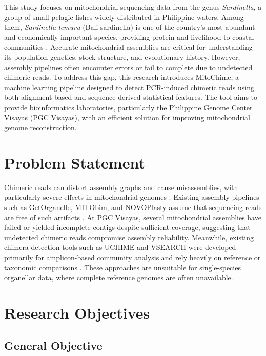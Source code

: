 This study focuses on mitochondrial sequencing data from the genus \textit{Sardinella}, a group of small pelagic fishes widely distributed in Philippine waters. Among them, \textit{Sardinella lemuru} (Bali sardinella) is one of the country’s most abundant and economically important species, providing protein and livelihood to coastal communities \citep{Willette2011,Labrador2021}. Accurate mitochondrial assemblies are critical for understanding its population genetics, stock structure, and evolutionary history. However, assembly pipelines often encounter errors or fail to complete due to undetected chimeric reads. To address this gap, this research introduces MitoChime, a machine learning pipeline designed to detect PCR-induced chimeric reads using both alignment-based and sequence-derived statistical features. The tool aims to provide bioinformatics laboratories, particularly the Philippine Genome Center Visayas (PGC Visayas), with an efficient solution for improving mitochondrial genome reconstruction.

\section{Problem Statement}\label{subsec:probstatement}

Chimeric reads can distort assembly graphs and cause misassemblies, with particularly severe effects in mitochondrial genomes \citep{Boore1999,Cameron2014}. Existing assembly pipelines such as GetOrganelle, MITObim, and NOVOPlasty assume that sequencing reads are free of such artifacts \citep{Hahn2013,Dierckxsens2017,Jin2020}. At PGC Visayas, several mitochondrial assemblies have failed or yielded incomplete contigs despite sufficient coverage, suggesting that undetected chimeric reads compromise assembly reliability. Meanwhile, existing chimera detection tools such as UCHIME and VSEARCH were developed primarily for amplicon-based community analysis and rely heavily on reference or taxonomic comparisons \citep{Edgar2011,Rognes2016}. These approaches are unsuitable for single-species organellar data, where complete reference genomes are often unavailable.

\section{Research Objectives}\label{subsecsec:researchobjectives}
\subsection{General Objective}\label{subsec:generalobjective}

